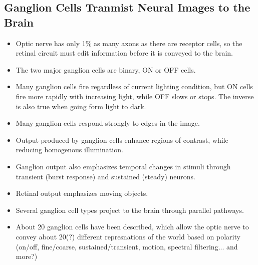 \documentclass[12pt,a4paper]{article}
\begin{document}
\subsection{Ganglion Cells Tranmist Neural Images to the Brain}
\begin{itemize}
    \item Optic nerve has only 1\% as many axons as there are receptor cells, so the retinal circuit must edit information before it is conveyed to the brain.
    \item The two major ganglion cells are binary, ON or OFF cells.
    \item Many ganglion cells fire regardless of current lighting condition, but ON cells fire more rapidly with increasing light, while OFF slows or stops. The inverse is also true when going form light to dark.
    \item Many ganglion cells respond strongly to edges in the image.
    \item Output produced by ganglion cells enhance regions of contrast, while reducing homogenous illumination.
    \item Ganglion output also emphasizes temporal changes in stimuli through transient (burst response) and sustained (steady) neurons.
    \item Retinal output emphasizes moving objects.
    \item Several ganglion cell types project to the brain through parallel pathways.
    \item About 20 ganglion cells have been described, which allow the optic nerve to convey about 20(?) different represnations of the world based on polarity (on/off, fine/coarse, sustained/transient, motion, spectral filtering... and more?)
\end{itemize}
\end{document}
